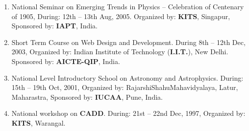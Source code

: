 \begin{enumerate}
\item
National Seminar on Emerging Trends in Physics – Celebration of Centenary of 1905, During: 12th – 13th Aug, 2005. Organized by: \textbf{KITS}, Singapur, Sponsored by: \textbf{IAPT}, India.

\item
Short Term Course on Web Design and Development. During 8th – 12th Dec, 2003, Organized by: Indian Institute of Technology (\textbf{I.I.T.}), New Delhi. Sponsored by: \textbf{AICTE-QIP}, India. 

\item
National Level Introductory School on Astronomy and Astrophysics. During: 15th – 19th Oct, 2001, Organized by: RajarshiShahuMahavidyalaya, Latur, Maharastra, Sponsored by: \textbf{IUCAA}, Pune, India.

\item
National workshop on \textbf{CADD}. During: 21st – 22nd Dec, 1997, Organized by: \textbf{KITS}, Warangal.

\end{enumerate}